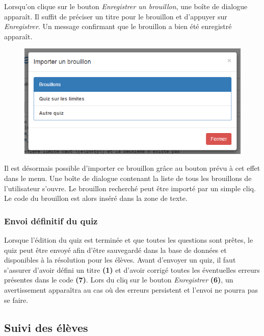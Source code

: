 \documentclass[a4,10pt,french]{sphinxmanual}
\begin{document}
Lorsqu'on clique sur le bouton \emph{Enregistrer un brouillon}, une boîte de dialogue apparaît. Il suffit de préciser un titre pour le brouillon et d'appuyer sur \emph{Enregistrer}. Un message confirmant que le brouillon a bien été enregistré apparaît.
\begin{figure}[htbp]
\centering

\includegraphics{draft-import.png}
\end{figure}

Il est désormais possible d'importer ce brouillon grâce au bouton prévu à cet effet dans le menu. Une boîte de dialogue contenant la liste de tous les brouillons de l'utilisateur s'ouvre. Le brouillon recherché peut être importé par un simple cliq. Le code du brouillon est alors inséré dans la zone de texte.


\subsubsection{Envoi définitif du quiz}
\label{doc-user:envoi-definitif-du-quiz}
Lorsque l'édition du quiz est terminée et que toutes les questions sont prêtes, le quiz peut être envoyé afin d'être sauvegardé dans la base de données et disponibles à la résolution pour les élèves. Avant d'envoyer un quiz, il faut s'assurer d'avoir défini un titre \textbf{(1)} et d'avoir corrigé toutes les éventuelles erreurs présentes dans le code \textbf{(7)}. Lors du cliq sur le bouton \emph{Enregistrer} \textbf{(6)}, un avertissement apparaîtra au cas où des erreurs persistent et l'envoi ne pourra pas se faire.


\subsection{Suivi des élèves}
\label{doc-user:suivi-des-eleves}
\end{document}
